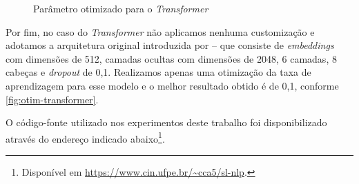 \begin{figure}[ht!]
    \centering
    \caption{\textmd{Parâmetro otimizado para o \textit{Transformer}}}
    \nomefonte{}
    \label{fig:otim-transformer}
\end{figure}



Por fim, no caso do \textit{Transformer} não aplicamos nenhuma customização e adotamos a arquitetura original introduzida por  -- que consiste de \textit{embeddings} com dimensões de 512, camadas ocultas com dimensões de 2048, 6 camadas, 8 cabeças e \textit{dropout} de 0,1.
Realizamos apenas uma otimização da taxa de aprendizagem para esse modelo e o melhor resultado obtido é de 0,1, conforme \autoref{fig:otim-transformer}.


O código-fonte utilizado nos experimentos deste trabalho foi disponibilizado através do endereço indicado abaixo\footnote{
    Disponível em \url{https://www.cin.ufpe.br/~cca5/sl-nlp}.
}.




